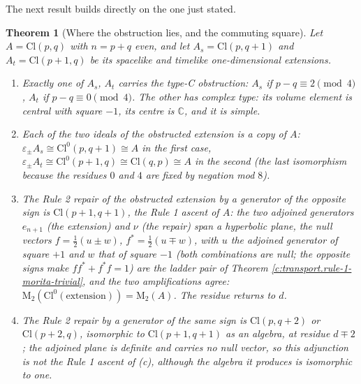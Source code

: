 \documentclass[11pt]{article}
\newtheorem{theorem}{Theorem}[section]
\theoremstyle{definition}
\theoremstyle{plain}
\newcommand{\changedmark}[2]{\marginpar{\raggedright\scriptsize\color{#1}#2}}
\providecommand{\C}{}\renewcommand{\C}{\mathbb{C}}
\providecommand{\Cl}{}\renewcommand{\Cl}{\mathrm{Cl}}
\providecommand{\Mat}{}\renewcommand{\Mat}{\mathrm{M}}
\begin{document}
The next result builds directly on the one just stated.

\begin{theorem}[Where the obstruction lies, and the commuting square]\label{c:transport.where-obstruction-lies-commuting-square}
\changedmark{BurntOrange}{changed since the deposit}
Let $A = \Cl(p,q)$ with $n = p + q$ even, and let $A_s = \Cl(p,q{+}1)$ and $A_t = \Cl(p{+}1,q)$ be its spacelike and timelike one-dimensional extensions.
\begin{enumerate}
\item[(a)] Exactly one of $A_s$, $A_t$ carries the type-C obstruction: $A_s$ if $p - q \equiv 2 \pmod 4$, $A_t$ if $p - q \equiv 0 \pmod 4$. The other has complex type: its volume element is central with square $-1$, its centre is $\C$, and it is simple.
\item[(b)] Each of the two ideals of the obstructed extension is a copy of $A$: $\varepsilon_\pm A_s \cong \Cl^0(p,q{+}1) \cong A$ in the first case, $\varepsilon_\pm A_t \cong \Cl^0(p{+}1,q) \cong \Cl(q,p) \cong A$ in the second (the last isomorphism because the residues $0$ and $4$ are fixed by negation mod $8$).
\item[(c)] The Rule 2 repair of the obstructed extension by a generator of the opposite sign is $\Cl(p{+}1,q{+}1)$, the Rule 1 ascent of $A$: the two adjoined generators $e_{n+1}$ (the extension) and $\nu$ (the repair) span a hyperbolic plane, the null vectors $f = \tfrac12(u \pm w)$, $f^* = \tfrac12(u \mp w)$, with $u$ the adjoined generator of square $+1$ and $w$ that of square $-1$ (both combinations are null; the opposite signs make $ff^* + f^*f = 1$) are the ladder pair of Theorem \ref{c:transport.rule-1-morita-trivial}, and the two amplifications agree: $\Mat_2(\Cl^0(\text{extension})) = \Mat_2(A)$. The residue returns to $d$.
\item[(d)] The Rule 2 repair by a generator of the same sign is $\Cl(p,q{+}2)$ or $\Cl(p{+}2,q)$, isomorphic to $\Cl(p{+}1,q{+}1)$ as an algebra, at residue $d \mp 2$; the adjoined plane is definite and carries no null vector, so this adjunction is not the Rule 1 ascent of (c), although the algebra it produces is isomorphic to one.
\end{enumerate}
\end{theorem}
\end{document}
